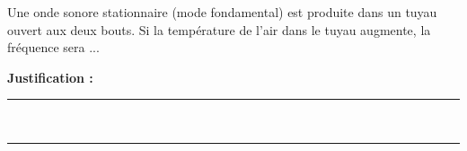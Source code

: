 Une onde sonore stationnaire (mode fondamental) est produite dans un tuyau ouvert aux deux bouts. Si la température de l'air dans le tuyau augmente, la fréquence sera ...

\choices

\noindent\textbf{Justification :} \hrulefill \\[2.5ex]
\rule{\linewidth}{0.4pt} \\[2.5ex]
\rule{\linewidth}{0.4pt}
\vfill
